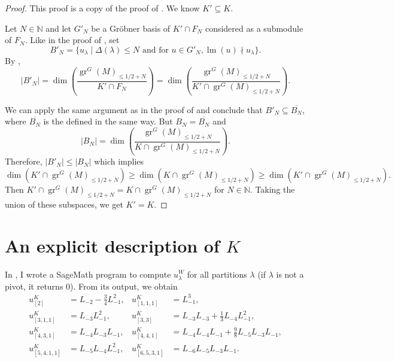 \documentclass[a4paper, 12pt, reqno]{amsart}
\theoremstyle{remark}
\DeclareMathOperator{\gr}{gr}
\DeclareMathOperator{\lm}{lm}
\begin{document}
\begin{proof}
  This proof is a copy of the proof of .
  We know $K' \subseteq K$.

  Let $N \in \mathbb{N}$ and let $G'_N$ be a Gr\"{o}bner basis of $K' \cap F_N$ considered as a submodule of $F_N$.
  Like in the proof of , set
  \begin{equation*}
    B'_N = \{u_{\lambda} \mid \Delta(\lambda) \le N\text{ and for }u \in G'_N, \lm(u) \nmid u_{\lambda}\}.
  \end{equation*}
  By \cite[Proposition 3.6.4]{adams_introduction_1994},
  \begin{equation*}
    |B'_N| = \dim\left(\frac{\gr^G(M)_{\le 1/2 + N}}{K' \cap F_N}\right) = \dim\left(\frac{\gr^G(M)_{\le 1/2 + N}}{K' \cap \gr^G(M)_{\le 1/2 + N}}\right).
  \end{equation*}

  We can apply the same argument as in the proof of  and conclude that $B'_N \subseteq \overline{B_N}$, where $\overline{B_N}$ is the defined in the same way.
  But $B_N = \overline{B_N}$ and
  \begin{equation*}
    |B_N| = \dim\left(\frac{\gr^G(M)_{\le 1/2 + N}}{K \cap \gr^G(M)_{\le 1/2 + N}}\right).
  \end{equation*}
  Therefore, $|B'_N| \le |B_N|$ which implies
  \begin{equation*}
    \dim(K' \cap \gr^G(M)_{\le 1/2 + N}) \ge \dim(K \cap \gr^G(M)_{\le 1/2 + N}) \ge \dim(K' \cap \gr^G(M)_{\le 1/2 + N}).
  \end{equation*}
  Then $K' \cap \gr^G(M)_{\le 1/2 + N} = K \cap \gr^G(M)_{\le 1/2 + N}$ for $N \in \mathbb{N}$.
  Taking the union of these subspaces, we get $K' = K$.
\end{proof}

\appendix
\section{An explicit description of $K$}
\label{sec:an-expl-descr}

In \cite[ising-modules.ipynb]{sagemath2}, I wrote a SageMath program to compute $u^W_{\lambda}$ for all partitions $\lambda$ (if $\lambda$ is not a pivot, it returns $0$).
From its output, we obtain
\begin{align*}
  u^K_{[2]} &= L_{-2} - \tfrac{3}{4}L_{-1}^2, &u^K_{[1, 1, 1]} &= L_{-1}^3, \\
  u^K_{[3, 1, 1]} &= L_{-3}L_{-1}^2, &u^K_{[3, 3]} &= L_{-3}L_{-3} + \tfrac{1}{3}L_{-4}L_{-1}^2, \\
  u^K_{[4, 3, 1]} &= L_{-4}L_{-3}L_{-1}, &u^K_{[4, 4, 1]} &= L_{-4}L_{-4}L_{-1} + \tfrac{9}{8}L_{-5}L_{-3}L_{-1}, \\
  u^K_{[5, 4, 1, 1]} &= L_{-5}L_{-4}L_{-1}^2, &u^K_{[6, 5, 3, 1]} &= L_{-6}L_{-5}L_{-3}L_{-1}.
\end{align*}
\end{document}
